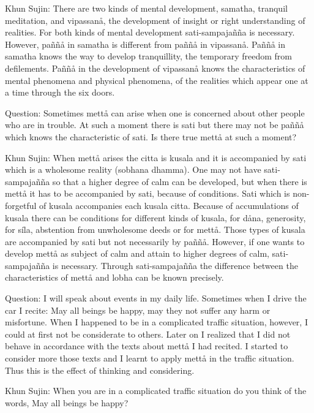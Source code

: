 \documentclass[12pt,twoside]{article}
\begin{document}
Khun Sujin: There are two kinds of mental development, samatha, tranquil
meditation, and vipassan{\aa}, the development of insight or right
understanding of realities. For both kinds of mental development
sati{}-sampaja\~n\~na is necessary. However, pa\~n\~n{\aa} in samatha
is different from pa\~n\~n{\aa} in vipassan{\aa}. Pa\~n\~n{\aa} in
samatha knows the way to develop tranquillity, the temporary freedom
from defilements. Pa\~n\~n{\aa} in the development of vipassan{\aa}
knows the characteristics of mental phenomena and physical phenomena,
of the realities which appear one at a time through the six doors. 

Question: Sometimes mett{\aa} can arise when one is concerned about
other people who are in trouble. At such a moment there is sati but
there may not be pa\~n\~n{\aa} which knows the characteristic of sati.
Is there true mett{\aa} at such a moment? 

Khun Sujin: When mett{\aa} arises the citta is kusala and it is
accompanied by sati which is a wholesome reality (sobhana dhamma). One
may not have sati{}-sampaja\~n\~na so that a higher degree of calm can
be developed, but when there is mett{\aa} it has to be accompanied by
sati, because of conditions. Sati which is non{}-forgetful of kusala
accompanies each kusala citta. Because of accumulations of kusala there
can be conditions for different kinds of kusala, for d{\aa}na,
generosity, for s\'ila, abstention from unwholesome deeds or for
mett{\aa}. Those types of kusala are accompanied by sati but not
necessarily by pa\~n\~n{\aa}. However, if one wants to develop
mett{\aa} as subject of calm and attain to higher degrees of calm,
sati{}-sampaja\~n\~na is necessary. Through sati{}-sampaja\~n\~na the
difference between the characteristics of mett{\aa} and lobha can be
known precisely. 

Question: I will speak about events in my daily life. Sometimes when I
drive the car I recite: {\textasciigrave}{\textasciigrave}May all
beings be happy, may they not suffer any harm or
misfortune.{\textquotesingle}{\textquotesingle} When I happened to be
in a complicated traffic situation, however, I could at first not be
considerate to others. Later on I realized that I did not behave in
accordance with the texts about mett{\aa} I had recited. I started to
consider more those texts and I learnt to apply mett{\aa} in the
traffic situation. Thus this is the effect of thinking and considering.


Khun Sujin: When you are in a complicated traffic situation do you think
of the words, {\textasciigrave}{\textasciigrave}May all beings be
happy{\textquotesingle}{\textquotesingle}?
\end{document}
